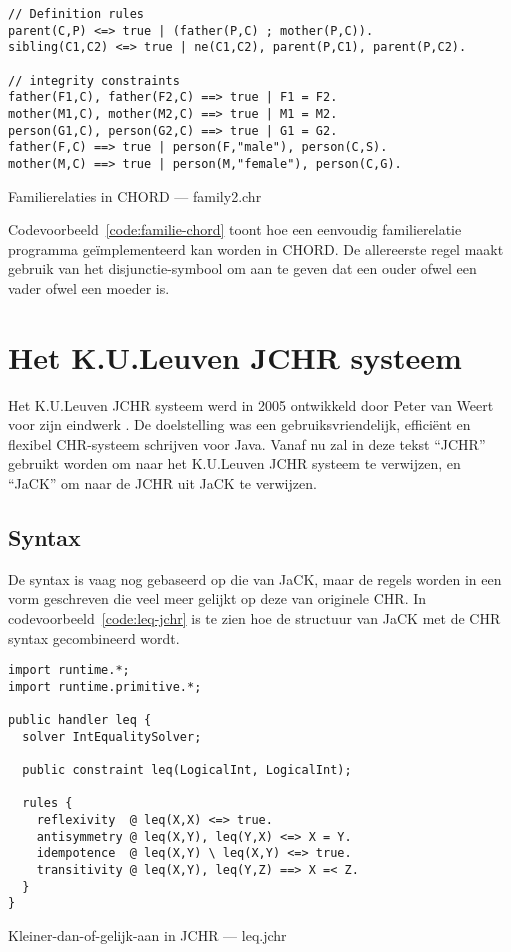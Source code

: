 \begin{exCode}[bhp]
\begin{Verbatim}[frame=single]
// Definition rules
parent(C,P) <=> true | (father(P,C) ; mother(P,C)).
sibling(C1,C2) <=> true | ne(C1,C2), parent(P,C1), parent(P,C2).

// integrity constraints
father(F1,C), father(F2,C) ==> true | F1 = F2.
mother(M1,C), mother(M2,C) ==> true | M1 = M2.
person(G1,C), person(G2,C) ==> true | G1 = G2.
father(F,C) ==> true | person(F,"male"), person(C,S).
mother(M,C) ==> true | person(M,"female"), person(C,G).
\end{Verbatim}
\caption{Familierelaties in CHORD --- family2.chr}
\label{code:familie-chord}
\end{exCode}
Codevoorbeeld~\ref{code:familie-chord} toont hoe een eenvoudig familierelatie programma ge\"implementeerd kan worden in CHORD. De allereerste regel maakt gebruik van het disjunctie-symbool \code{;} om aan te geven dat een ouder ofwel een vader ofwel een moeder is.

\section{Het K.U.Leuven JCHR systeem}

Het K.U.Leuven JCHR systeem werd in 2005 ontwikkeld door Peter van Weert voor zijn eindwerk \cite{jchr_thesis}. De doelstelling was een gebruiksvriendelijk, effici\"ent en flexibel CHR-systeem schrijven voor Java. Vanaf nu zal in deze tekst ``JCHR'' gebruikt worden om naar het K.U.Leuven JCHR systeem te verwijzen, en ``JaCK'' om naar de JCHR uit JaCK te verwijzen.

\subsection{Syntax}

De syntax is vaag nog gebaseerd op die van JaCK, maar de regels worden in een vorm geschreven die veel meer gelijkt op deze van originele CHR. In codevoorbeeld~\ref{code:leq-jchr} is te zien hoe de structuur van JaCK met de CHR syntax gecombineerd wordt.
\begin{exCode}
\begin{Verbatim}[frame=single]
import runtime.*;
import runtime.primitive.*;

public handler leq {
  solver IntEqualitySolver;

  public constraint leq(LogicalInt, LogicalInt);

  rules {
    reflexivity  @ leq(X,X) <=> true.
    antisymmetry @ leq(X,Y), leq(Y,X) <=> X = Y.
    idempotence  @ leq(X,Y) \ leq(X,Y) <=> true.
    transitivity @ leq(X,Y), leq(Y,Z) ==> X =< Z.
  }
}

\end{Verbatim}
\caption{Kleiner-dan-of-gelijk-aan in JCHR --- leq.jchr}
\label{code:leq-jchr}
\end{exCode}

